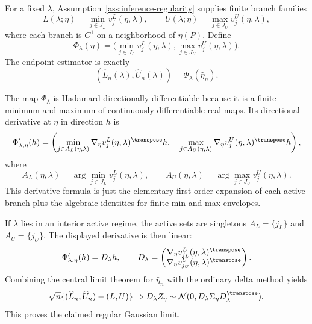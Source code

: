 For a fixed \(\lambda\), Assumption~\ref{ass:inference-regularity} supplies finite
branch families
\[
  L(\lambda;\eta)=\min_{j\in J_L}v^L_j(\eta,\lambda),
  \qquad
  U(\lambda;\eta)=\max_{j\in J_U}v^U_j(\eta,\lambda),
\]
where each branch is \(C^1\) on a neighborhood of \(\eta(P)\).  Define
\[
  \Phi_\lambda(\eta)
  =
  \bigl(\min_{j\in J_L}v^L_j(\eta,\lambda),
        \max_{j\in J_U}v^U_j(\eta,\lambda)\bigr).
\]
The endpoint estimator is exactly
\[
  (\widehat L_n(\lambda),\widehat U_n(\lambda))
  =\Phi_\lambda(\widehat\eta_n).
\]

The map \(\Phi_\lambda\) is Hadamard directionally differentiable because it is a
finite minimum and maximum of continuously differentiable real maps.  Its directional
derivative at \(\eta\) in direction \(h\) is
\[
  \Phi'_{\lambda,\eta}(h)
  =
  \left(
    \min_{j\in A_L(\eta,\lambda)}
      \nabla_\eta v^L_j(\eta,\lambda)^\transpose h,\quad
    \max_{j\in A_U(\eta,\lambda)}
      \nabla_\eta v^U_j(\eta,\lambda)^\transpose h
  \right),
\]
where
\[
  A_L(\eta,\lambda)=\arg\min_{j\in J_L}v^L_j(\eta,\lambda),
  \qquad
  A_U(\eta,\lambda)=\arg\max_{j\in J_U}v^U_j(\eta,\lambda).
\]
This derivative formula is just the elementary first-order expansion of each active
branch plus the algebraic identities for finite min and max envelopes.

If \(\lambda\) lies in an interior active regime, the active sets are singletons
\(A_L=\{j_L\}\) and \(A_U=\{j_U\}\).  The displayed derivative is then linear:
\[
  \Phi'_{\lambda,\eta}(h)
  =
  D_\lambda h,\qquad
  D_\lambda=
  \begin{pmatrix}
    \nabla_\eta v^L_{j_L}(\eta,\lambda)^\transpose\\
    \nabla_\eta v^U_{j_U}(\eta,\lambda)^\transpose
  \end{pmatrix}.
\]
Combining the central limit theorem for \(\widehat\eta_n\) with the ordinary delta
method yields
\[
  \sqrt n\{(\widehat L_n,\widehat U_n)-(L,U)\}
  \Rightarrow
  D_\lambda Z_\eta
  \sim
  \mathcal N(0,D_\lambda\Sigma_\eta D_\lambda^\transpose).
\]
This proves the claimed regular Gaussian limit.

